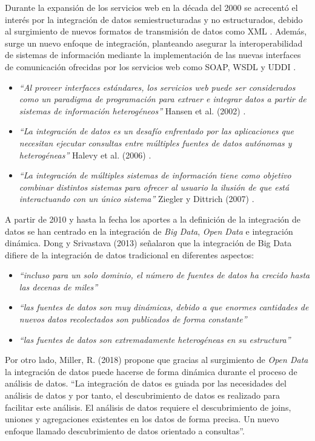 Durante la expansión de los servicios web en la década del 2000 se acrecentó el interés por la integración
de datos semiestructuradas y no estructurados, debido al surgimiento de nuevos formatos de transmisión
de datos como XML \cite{bourret1999xml}. Además, surge un nuevo enfoque de integración, planteando asegurar la interoperabilidad
de sistemas de información mediante la implementación de las nuevas interfaces de comunicación ofrecidas por los servicios web como SOAP, WSDL y UDDI \cite{curbera2002soap}.

\begin{itemize}
    \item \textit{``Al proveer interfaces estándares, los servicios web puede ser considerados como un paradigma de 
    programación para extraer e integrar datos a partir de sistemas de información heterogéneos''} Hansen et al. (2002) \cite{hansen2002data}.
    
    \item \textit{``La integración de datos es un desafío enfrentado por las aplicaciones que necesitan
    ejecutar consultas entre múltiples fuentes de datos autónomas y heterogéneas''} Halevy et al. (2006) \cite{halevy2006data}. 
    
    \item \textit{``La integración de múltiples sistemas de información tiene como objetivo combinar distintos sistemas para ofrecer
    al usuario la ilusión de que está interactuando con un único sistema''}  Ziegler y Dittrich (2007) \cite{ziegler2007data}.

\end{itemize}

A partir de 2010 y hasta la fecha los aportes a la definición de la integración de datos se han
centrado en la integración de \textit{Big Data}, \textit{Open Data} e integración dinámica.
Dong y Srivastava (2013) \cite{dong2013big} señalaron que la integración de Big Data difiere de la integración
de datos tradicional en diferentes aspectos:
    \begin{itemize}
        \item \textit{``incluso para un solo dominio, el número de fuentes de datos ha crecido hasta las decenas de miles''}
        \item \textit{``las fuentes de datos son muy dinámicas, debido a que enormes cantidades de nuevos datos recolectados son
        publicados de forma constante''}
        \item \textit{``las fuentes de datos son extremadamente heterogéneas en su estructura''}
    \end{itemize}
Por otro lado, Miller, R. (2018) \cite{miller2018open} propone que gracias al surgimiento de \textit{Open Data} la integración de datos
puede hacerse de forma dinámica durante el proceso de análisis de datos. ``La integración de datos es guiada
por las necesidades del análisis de datos y por tanto, el descubrimiento de datos es realizado para facilitar este análisis.
El análisis de datos requiere el descubrimiento de joins, uniones y agregaciones existentes en los datos de forma
precisa. Un nuevo enfoque llamado descubrimiento de datos orientado a consultas''.

